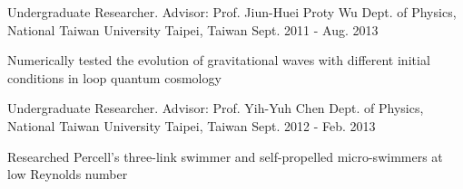 \begin{cventries}

\cventry
{Undergraduate Researcher. Advisor: Prof. Jiun-Huei Proty Wu} %
{Dept. of Physics, National Taiwan University} %
{Taipei, Taiwan} %
{Sept. 2011 - Aug. 2013} %
{ %
\begin{cvitems}
\item {Numerically tested the evolution of gravitational waves with different initial conditions in loop quantum cosmology}
\end{cvitems} 
}


\cventry
{Undergraduate Researcher. Advisor: Prof. Yih-Yuh Chen} %
{Dept. of Physics, National Taiwan University} %
{Taipei, Taiwan} %
{Sept. 2012 - Feb. 2013} %
{ %
\begin{cvitems}
\item {Researched Percell’s three-link swimmer and self-propelled micro-swimmers at low Reynolds number}
\end{cvitems} 
}


\end{cventries}